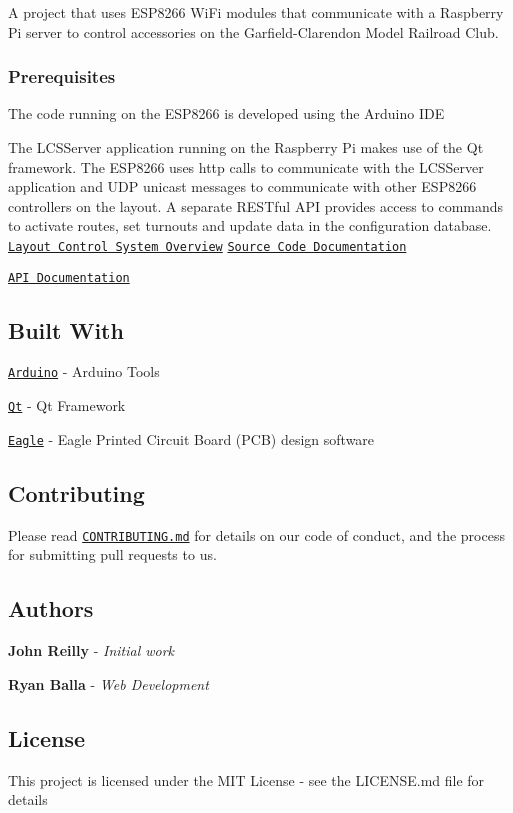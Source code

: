 A project that uses E\+S\+P8266 Wi\+Fi modules that communicate with a Raspberry Pi server to control accessories on the Garfield-\/\+Clarendon Model Railroad Club.

\subsubsection*{Prerequisites}

The code running on the E\+S\+P8266 is developed using the Arduino I\+DE

The L\+C\+S\+Server application running on the Raspberry Pi makes use of the Qt framework. The E\+S\+P8266 uses http calls to communicate with the L\+C\+S\+Server application and U\+DP unicast messages to communicate with other E\+S\+P8266 controllers on the layout. A separate R\+E\+S\+Tful A\+PI provides access to commands to activate routes, set turnouts and update data in the configuration database. \href{https://garfieldclarendon.github.io/Documents/LCSOverview.pdf}{\tt Layout Control System Overview} \href{https://garfieldclarendon.github.io/html/index.html}{\tt Source Code Documentation}

\href{https://garfieldclarendon.github.io/apidoc/index.html}{\tt A\+PI Documentation}

\subsection*{Built With}


\begin{DoxyItemize}
\item \href{https://www.arduino.cc/en/Main/Software}{\tt Arduino} -\/ Arduino Tools
\item \href{https://www.qt.io/}{\tt Qt} -\/ Qt Framework
\item \href{https://www.autodesk.com/products/eagle/overview}{\tt Eagle} -\/ Eagle Printed Circuit Board (P\+CB) design software
\end{DoxyItemize}

\subsection*{Contributing}

Please read \href{https://gist.github.com/PurpleBooth/b24679402957c63ec426}{\tt C\+O\+N\+T\+R\+I\+B\+U\+T\+I\+N\+G.\+md} for details on our code of conduct, and the process for submitting pull requests to us.

\subsection*{Authors}


\begin{DoxyItemize}
\item {\bfseries John Reilly} -\/ {\itshape Initial work}
\item {\bfseries Ryan Balla} -\/ {\itshape Web Development}
\end{DoxyItemize}

\subsection*{License}

This project is licensed under the M\+IT License -\/ see the L\+I\+C\+E\+N\+SE.md file for details 